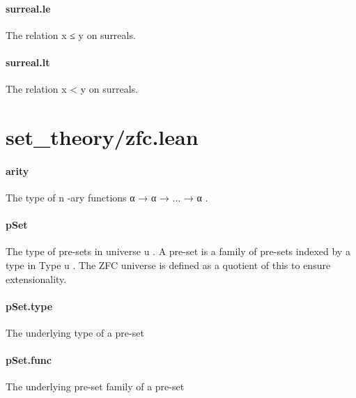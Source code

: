 \documentclass{article}
\begin{document}
\paragraph{surreal.le}
\par
The relation 
\colorbox[RGB]{253,246,227}{{{{\color[RGB]{101, 123, 131} x  }}}{{{\color[RGB]{181, 137, 0} ≤ }}}{{{\color[RGB]{101, 123, 131}  y }}}} on surreals.
\paragraph{surreal.lt}
\par
The relation 
\colorbox[RGB]{253,246,227}{{{{\color[RGB]{101, 123, 131} x  }}}{{{\color[RGB]{181, 137, 0} < }}}{{{\color[RGB]{101, 123, 131}  y }}}} on surreals.
\section{set\_theory/zfc.lean}\paragraph{arity}
\par
The type of 
\colorbox[RGB]{253,246,227}{{{{\color[RGB]{101, 123, 131} n }}}}-ary functions 
\colorbox[RGB]{253,246,227}{{{{\color[RGB]{101, 123, 131} α  }}}{{{\color[RGB]{133, 153, 0} → }}}{{{\color[RGB]{101, 123, 131}  α  }}}{{{\color[RGB]{133, 153, 0} → }}}{{{\color[RGB]{101, 123, 131}  ...  }}}{{{\color[RGB]{133, 153, 0} → }}}{{{\color[RGB]{101, 123, 131}  α }}}}.
\paragraph{pSet}
\par
The type of pre-sets in universe 
\colorbox[RGB]{253,246,227}{{{{\color[RGB]{101, 123, 131} u }}}}. A pre-set
is a family of pre-sets indexed by a type in 
\colorbox[RGB]{253,246,227}{{{{\color[RGB]{38, 139, 210} Type }}}{{{\color[RGB]{101, 123, 131}  u }}}}.
The ZFC universe is defined as a quotient of this
to ensure extensionality.
\paragraph{pSet.type}
\par
The underlying type of a pre-set
\paragraph{pSet.func}
\par
The underlying pre-set family of a pre-set
\end{document}
